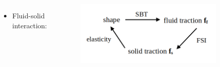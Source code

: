 \documentclass{beamer}
\newcommand{\bi}{\begin{itemize}}
\newcommand{\ei}{\end{itemize}}
\begin{document}
\begin{frame}
\begin{overlayarea}{\textwidth}{\textheight}
\vspace{0.2cm}
		\begin{columns}
				\vspace{-0.6cm} 
			\bi
			\item Fluid-solid interaction: 
			\ei
			 \vspace{-0.35cm}
			\begin{figure}[htb]
				\begin{center}
					\includegraphics[width=0.9\textwidth]{plots/schematic/logic.png}
				\end{center}
			\end{figure}
		\end{columns}\vspace{0.1cm}
	\end{overlayarea}
\end{frame}

\end{document}
